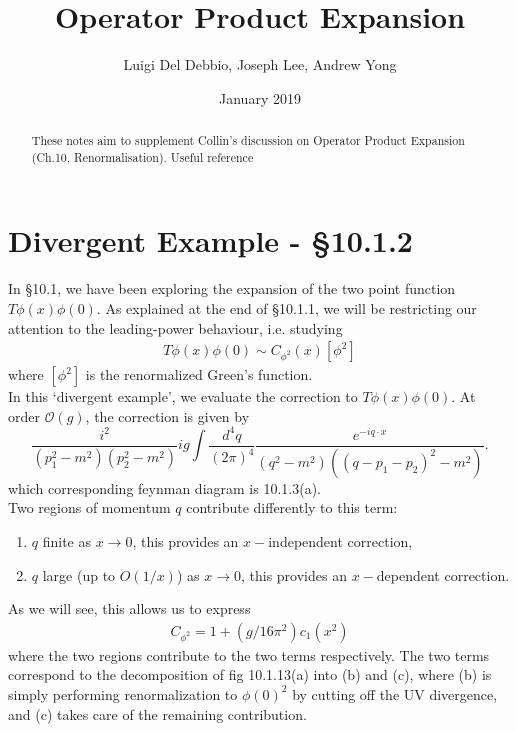 \documentclass{scrartcl}
\title{Operator Product Expansion}
\author{Luigi Del Debbio, Joseph Lee, Andrew Yong}
\date{January 2019}
\begin{document}
\maketitle
\renewcommand{\abstractname}{\vspace{-\baselineskip}}
\begin{abstract}
These notes aim to supplement Collin's discussion on Operator Product Expansion (Ch.10, Renormalisation\cite{collins_1984}). Useful reference \cite{schwartz}
\end{abstract}

\section{Divergent Example - \S 10.1.2}
In \S10.1, we have been exploring the expansion of the two point function $T\phi(x)\phi(0)$. As explained at the end of \S10.1.1, we will be restricting our attention to the leading-power behaviour, i.e. studying
\begin{align*}
    T\phi(x)\phi(0) \sim C_{\phi^2}(x)[\phi^2]
\end{align*}
where $[\phi^2]$ is the renormalized Green's function. \\

In this `divergent example', we evaluate the correction to $T\phi(x)\phi(0)$. At order $\mathcal{O}(g)$, the correction is given by
\begin{equation}
    \frac{i^2}{(p_1^2-m^2)(p_2^2-m^2)}ig\int \frac{d^4q}{(2\pi)^4} \frac{e^{-iq\cdot x}}{(q^2-m^2)((q-p_1-p_2)^2 - m^2)}.
    \label{loopOg}
\end{equation}
which corresponding feynman diagram is 10.1.3(a).\\

Two regions of momentum $q$ contribute differently to this term:
\begin{enumerate}
    \item $q$ finite as $x \rightarrow 0$, this  provides an $x-$independent correction,
    \item $q$ large (up to $O(1/x)$) as $x \rightarrow 0$, this  provides an $x-$dependent correction.
\end{enumerate}
As we will see, this allows us to express 
\begin{align}
    C_{\phi^2} = 1 + (g/16\pi^2)c_1(x^2)
\end{align}
where the two regions contribute to the two terms respectively. The two terms correspond to the decomposition of fig  10.1.13(a) into (b) and (c), where (b) is simply performing renormalization to $\phi(0)^2$ by cutting off the UV divergence, and (c) takes care of the remaining contribution. 
\end{document}
